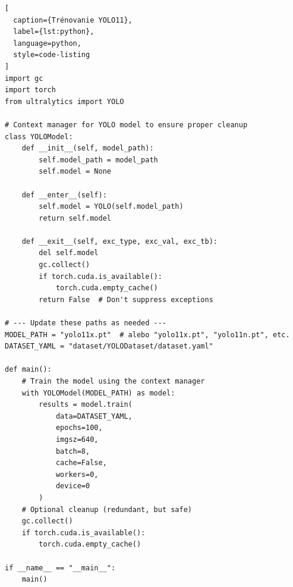 \begin{lstlisting}[
  caption={Trénovanie YOLO11},
  label={lst:python},
  language=python,
  style=code-listing
]
import gc
import torch
from ultralytics import YOLO

# Context manager for YOLO model to ensure proper cleanup
class YOLOModel:
    def __init__(self, model_path):
        self.model_path = model_path
        self.model = None

    def __enter__(self):
        self.model = YOLO(self.model_path)
        return self.model

    def __exit__(self, exc_type, exc_val, exc_tb):
        del self.model
        gc.collect()
        if torch.cuda.is_available():
            torch.cuda.empty_cache()
        return False  # Don't suppress exceptions

# --- Update these paths as needed ---
MODEL_PATH = "yolo11x.pt"  # alebo "yolo11x.pt", "yolo11n.pt", etc.
DATASET_YAML = "dataset/YOLODataset/dataset.yaml"

def main():
    # Train the model using the context manager
    with YOLOModel(MODEL_PATH) as model:
        results = model.train(
            data=DATASET_YAML,
            epochs=100,
            imgsz=640,
            batch=8,
            cache=False,
            workers=0,
            device=0
        )
    # Optional cleanup (redundant, but safe)
    gc.collect()
    if torch.cuda.is_available():
        torch.cuda.empty_cache()

if __name__ == "__main__":
    main()

\end{lstlisting}
